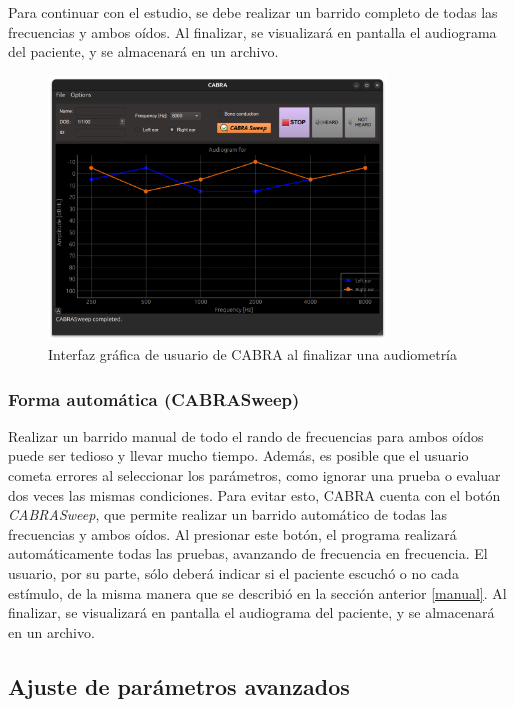 Para continuar con el estudio, se debe realizar un barrido completo de todas las frecuencias y ambos oídos.
Al finalizar, se visualizará en pantalla el audiograma del paciente, y se almacenará en un archivo.

\begin{figure}[H]
    \centering
    \includegraphics[width=0.8\textwidth]{figuras/GUI_audiogram}
    \caption{Interfaz gráfica de usuario de CABRA al finalizar una audiometría}
    \label{fig:GUI_audiogram}
\end{figure}


\subsubsection{Forma automática (CABRASweep)}

Realizar un barrido manual de todo el rando de frecuencias para ambos oídos puede ser tedioso y llevar mucho tiempo.
Además, es posible que el usuario cometa errores al seleccionar los parámetros, como ignorar una prueba o evaluar
dos veces las mismas condiciones.
Para evitar esto, CABRA cuenta con el botón \textit{CABRASweep}, que permite realizar un barrido automático de todas
las frecuencias y ambos oídos.
Al presionar este botón, el programa realizará automáticamente todas las pruebas, avanzando de frecuencia en
frecuencia.
El usuario, por su parte, sólo deberá indicar si el paciente escuchó o no cada estímulo, de la misma manera que se
describió en la sección anterior \ref{manual}.
Al finalizar, se visualizará en pantalla el audiograma del paciente, y se almacenará en un archivo.

\subsection{Ajuste de parámetros avanzados}


